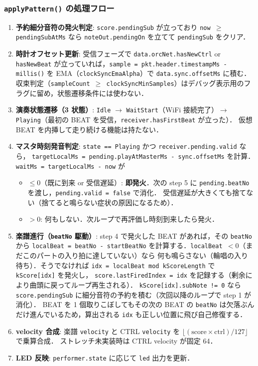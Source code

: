 \documentclass[lualatex,book,paper=a4paper,jafontsize=11.5pt,jafontscale=1.05]{jlreq}
\begin{document}
\subsubsection{\texttt{applyPattern()} の処理フロー}

\begin{enumerate}
  \item \textbf{予約細分音符の発火判定}: \texttt{score.pendingSub} が立っており \texttt{now $\geq$ pendingSubAtMs} なら
        \texttt{noteOut.pendingOn} を立てて \texttt{pendingSub} をクリア．
  \item \textbf{時計オフセット更新}: 受信フェーズで \texttt{data.orcNet.hasNewCtrl} or
        \texttt{hasNewBeat} が立っていれば，\texttt{sample = pkt.header.timestampMs - millis()}
        を EMA（\texttt{clockSyncEmaAlpha}）で \texttt{data.sync.offsetMs} に積む．
        収束判定（\texttt{sampleCount $\geq$ clockSyncMinSamples}）はデバッグ表示用のフラグに留め，状態遷移条件には使わない．
  \item \textbf{演奏状態遷移（3 状態）}: \texttt{Idle} $\to$ \texttt{WaitStart}（WiFi 接続完了）$\to$
        \texttt{Playing}（最初の BEAT を受信，\texttt{receiver.hasFirstBeat} が立った）．
        仮想 BEAT を内挿して走り続ける機能は持たない．
  \item \textbf{マスタ時刻発音判定}: \texttt{state == Playing} かつ \texttt{receiver.pending.valid} なら，
        \texttt{targetLocalMs = pending.playAtMasterMs - sync.offsetMs} を計算．
        \texttt{waitMs = targetLocalMs - now} が
        \begin{itemize}\setlength{\itemsep}{0pt}
          \item $\leq 0$（既に到来 or 受信遅延）: \textbf{即発火}．次の step 5 に \texttt{pending.beatNo} を渡し，\texttt{pending.valid = false} で消化．
                受信遅延が大きくても捨てない（捨てると鳴らない症状の原因になるため）．
          \item $> 0$: 何もしない．次ループで再評価し時刻到来したら発火．
        \end{itemize}
  \item \textbf{楽譜進行（\texttt{beatNo} 駆動）}: step 4 で発火した BEAT があれば，その \texttt{beatNo} から
        \texttt{localBeat = beatNo - startBeatNo} を計算する．\texttt{localBeat $< 0$}（まだこのパートの入り拍に達していない）なら
        何も鳴らさない（輪唱の入り待ち）．そうでなければ \texttt{idx = localBeat mod kScoreLength} で \texttt{kScore[idx]} を発火し，
        \texttt{score.lastFiredIndex = idx} を記録する（剰余により曲頭に戻ってループ再生される）．
        \texttt{kScore[idx].subNote != 0} なら \texttt{score.pendingSub} に細分音符の予約を積む（次回以降のループで step 1 が消化）．
        BEAT を 1 個取りこぼしてもその次の BEAT の \texttt{beatNo} は欠落ぶんだけ進んでいるため，算出される \texttt{idx} も正しい位置に飛び自己修復する．
  \item \textbf{velocity 合成}: 楽譜 \texttt{velocity} と CTRL \texttt{velocity} を
        $\lfloor (\text{score} \times \text{ctrl}) / 127 \rfloor$ で乗算合成．
        ストレッチ未実装時は CTRL velocity が固定 64．
  \item \textbf{LED 反映}: \texttt{performer.state} に応じて \texttt{led} 出力を更新．
\end{enumerate}
\end{document}
